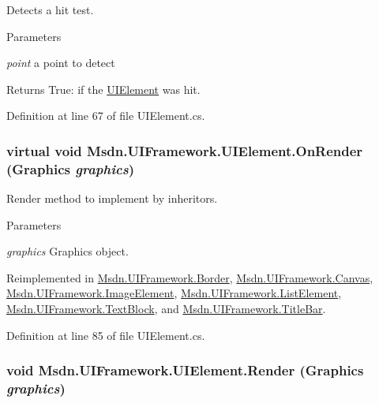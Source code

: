 Detects a hit test. 
\begin{DoxyParams}{Parameters}
\item[{\em point}]a point to detect\end{DoxyParams}
\begin{DoxyReturn}{Returns}
True: if the \hyperlink{class_msdn_1_1_u_i_framework_1_1_u_i_element}{UIElement} was hit.
\end{DoxyReturn}


Definition at line 67 of file UIElement.cs.\hypertarget{class_msdn_1_1_u_i_framework_1_1_u_i_element_a20b2245806231553935896fe7731812b}{
\subsubsection[{OnRender}]{\setlength{\rightskip}{0pt plus 5cm}virtual void Msdn.UIFramework.UIElement.OnRender (Graphics {\em graphics})}}
\label{class_msdn_1_1_u_i_framework_1_1_u_i_element_a20b2245806231553935896fe7731812b}


Render method to implement by inheritors. 
\begin{DoxyParams}{Parameters}
\item[{\em graphics}]Graphics object.\end{DoxyParams}


Reimplemented in \hyperlink{class_msdn_1_1_u_i_framework_1_1_border_a69a519c3ec33e09fc09de0e6100414fe}{Msdn.UIFramework.Border}, \hyperlink{class_msdn_1_1_u_i_framework_1_1_canvas_af1a17712fcb11abb9200f7780aa66136}{Msdn.UIFramework.Canvas}, \hyperlink{class_msdn_1_1_u_i_framework_1_1_image_element_acf50352e5c1e7d09d308d32362fda263}{Msdn.UIFramework.ImageElement}, \hyperlink{class_msdn_1_1_u_i_framework_1_1_list_element_ac0b1519bbc015086de494e64b0238b5e}{Msdn.UIFramework.ListElement}, \hyperlink{class_msdn_1_1_u_i_framework_1_1_text_block_a64a6a9fdda4cfe9c5781d1c54ce3da84}{Msdn.UIFramework.TextBlock}, and \hyperlink{class_msdn_1_1_u_i_framework_1_1_title_bar_a55b0b153ab7d2b085e6731e3f6aaa55e}{Msdn.UIFramework.TitleBar}.

Definition at line 85 of file UIElement.cs.\hypertarget{class_msdn_1_1_u_i_framework_1_1_u_i_element_a5a13a9db26f3f4b0ec8dfa11b539df0e}{
\subsubsection[{Render}]{\setlength{\rightskip}{0pt plus 5cm}void Msdn.UIFramework.UIElement.Render (Graphics {\em graphics})}}
\label{class_msdn_1_1_u_i_framework_1_1_u_i_element_a5a13a9db26f3f4b0ec8dfa11b539df0e}


